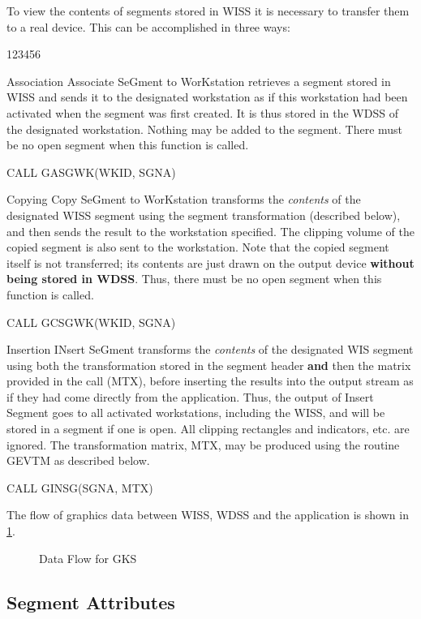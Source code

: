 To view the contents of segments stored in WISS
it is necessary to transfer them to a real device.
This can be accomplished in three ways:
\begin{DLtt}{123456}
\item[Association]
Associate SeGment to WorKstation retrieves a segment stored in WISS
and sends it to the designated workstation as if this workstation had been
activated when the segment was first created.
It is thus stored in the WDSS of the designated workstation.
Nothing may be added to the segment.
There must be no open segment when this function is called.
\begin{XMP}
CALL GASGWK(WKID, SGNA)
\end{XMP}
\item[Copying]
Copy SeGment to WorKstation transforms the {\it contents}
of the designated WISS segment using the segment transformation
(described below), and then sends the result to the workstation specified.
The clipping volume of the copied segment is also sent to the
workstation. Note that the copied segment itself is not transferred;
its contents are just drawn on the output device {\bf without being
stored in WDSS}.
Thus, there must be no open segment when this function is called.
\begin{XMP}
CALL GCSGWK(WKID, SGNA)
\end{XMP}
\item[Insertion]
INsert SeGment transforms the {\it contents} of the designated WIS
 segment using both the transformation stored in the segment header
{\bf and} then the matrix provided in the call (MTX),
before inserting the results into the output stream as if
they had come directly from the application.
Thus, the output of Insert Segment goes to all activated workstations,
including the WISS, and will be stored in a segment if one is open.
All clipping rectangles and indicators, etc. are ignored.
The transformation matrix, MTX, may be produced using the routine
GEVTM as described below.
\begin{XMP}
CALL GINSG(SGNA, MTX)
\end{XMP}
\end{DLtt}
The flow of graphics data between WISS, WDSS and the application
is shown in \ref{fig:dataflo}.
\begin{figure}[h]
\caption{Data Flow for GKS}
\label{fig:dataflo}
\end{figure}
\subsection{Segment Attributes}
 

